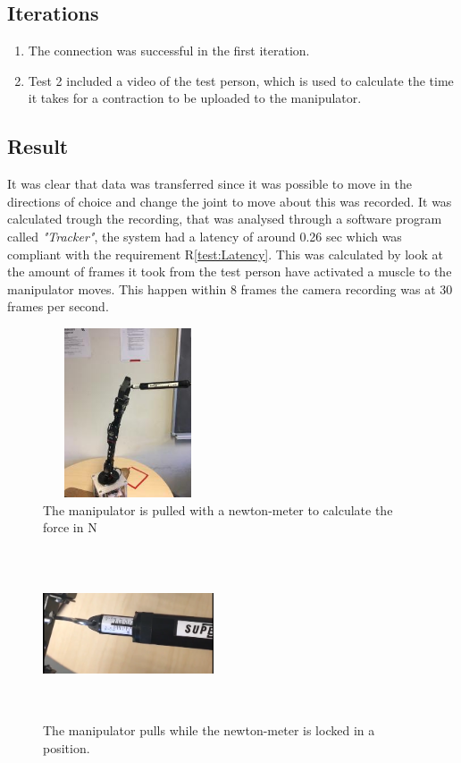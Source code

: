 \subsection*{Iterations}
\begin{enumerate}
    \item The connection was successful in the first iteration.
    \item Test 2 included a video of the test person, which is used to calculate the time it takes for a contraction to be uploaded to the manipulator.
\end{enumerate}
\subsection*{Result}
 It was clear that data was transferred since it was possible to move in the directions of choice and change the joint to move about this was recorded. 
  It was calculated trough the recording, that was analysed through a software program called \textit{"Tracker"}, the system had a latency of around 0.26 sec which was compliant with the requirement R\ref{test:Latency}. This was calculated by look at the amount of frames it took from the test person have activated a muscle to the manipulator moves. This happen within 8 frames the camera recording was at 30 frames per second.
\newpage


\begin{multicols}{2}
\begin{figure}[H]
    \centering
    \includegraphics[width=0.45\textwidth, height=5cm]{Figures/Technical_figures/image5.jpg}
    \caption{The manipulator is pulled with a newton-meter to calculate the force in N}
    \label{fig:Nm}
\end{figure}
\columnbreak
\begin{figure}[H]
    \centering
    \includegraphics[width=0.45\textwidth,height=5cm]{Figures/Technical_figures/Capture.png}
    \caption{The manipulator pulls while the newton-meter is locked in a position.}
    \label{fig:pull}
\end{figure}
\end{multicols}
